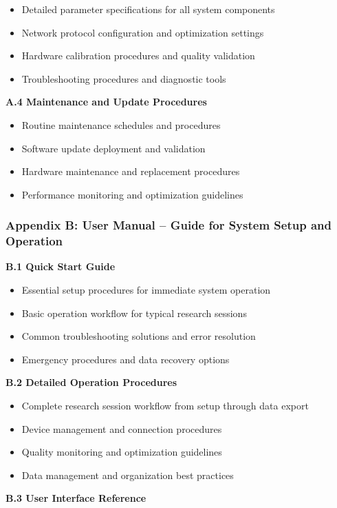 \documentclass[12pt,a4paper]{report}
\begin{document}
\begin{itemize}
\item Detailed parameter specifications for all system components
\item Network protocol configuration and optimization settings
\item Hardware calibration procedures and quality validation
\item Troubleshooting procedures and diagnostic tools

\end{itemize}
\textbf{A.4 Maintenance and Update Procedures}

\begin{itemize}
\item Routine maintenance schedules and procedures
\item Software update deployment and validation
\item Hardware maintenance and replacement procedures
\item Performance monitoring and optimization guidelines

\end{itemize}
\subsubsection{Appendix B: User Manual – Guide for System Setup and Operation}

\textbf{B.1 Quick Start Guide}

\begin{itemize}
\item Essential setup procedures for immediate system operation
\item Basic operation workflow for typical research sessions
\item Common troubleshooting solutions and error resolution
\item Emergency procedures and data recovery options

\end{itemize}
\textbf{B.2 Detailed Operation Procedures}

\begin{itemize}
\item Complete research session workflow from setup through data export
\item Device management and connection procedures
\item Quality monitoring and optimization guidelines
\item Data management and organization best practices

\end{itemize}
\textbf{B.3 User Interface Reference}
\end{document}
